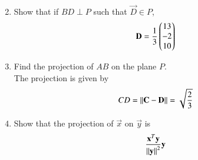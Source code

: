 \begin{enumerate}[label=\arabic*.,ref=\thesubsection.\theenumi]
\begin{align}
\end{align}
% 
\item Show that if $BD \perp P$  such that $\vec{D} \in P$,
\begin{equation}
\mathbf{D} = \frac{1}{3}\begin{pmatrix}13 \\ -2 \\ 10\end{pmatrix}
\end{equation}
%
\item Find the projection of $AB$ on the plane $P$.
\\
\solution The projection is given by
\begin{align}
CD = \left\lVert\mathbf{C}-\mathbf{D}\right\rVert = \sqrt{\frac{2}{3}}
\end{align}
\item Show that the projection of $\vec{x}$ on $\vec{y}$ is
\begin{align}
\label{eq:2019_qp2_14_proj}
\frac{\mathbf{x}^T\mathbf{y}}{\left\lVert\mathbf{y}\right\rVert^2}\mathbf{y}
\end{align}
\end{enumerate}
